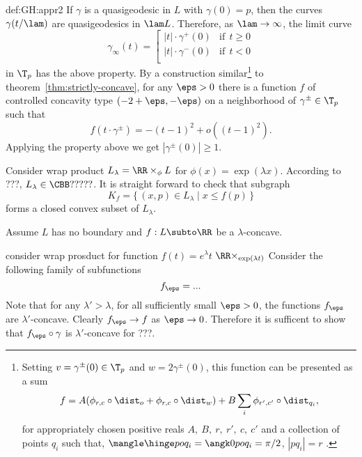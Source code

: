 {\begin{subthm}{def:GH:appr2}
If $\gamma$  is a quasigeodesic in $L$ with $\gamma(0)=p$, then the curves
$\gamma(t/\lam)$ are quasigeodesics in $\lam L$. 
Therefore, as $\lam\to\infty$, the limit curve
$$\gamma_\infty(t)=\left[\begin{matrix}
|t|\cdot\gamma^+(0)&\text{if}\ \  t\ge0\\
|t|\cdot\gamma^-(0)&\text{if}\ \  t<0\\
          \end{matrix}\right.$$
in $\T_p$ has the above property.
By a construction similar\footnote{Setting $v=\gamma^\pm(0)\in \T_p$ and
$w=2\gamma^\pm(0)$, this function can be presented as a sum
$$f=A(\phi_{r,c}\circ\dist_{o}+\phi_{r,c}\circ\dist_w)+B\sum_i\phi_{r',c'}
\circ\dist_{q_i},$$
for appropriately chosen positive reals 
$A,\ B,\ r,\ r',\ c,\ c'$ and a collection of points $q_i$ such that,
$\mangle \hinge p o {q_i}=\angk 0 p o {q_i}=\pi/2$, $|p q_i|=r$ .} 
to theorem~\ref{thm:strictly-concave}, for any $\eps>0$ there is a function $f$ of controlled
concavity type $(-2+\eps,-\eps)$ on a neighborhood of $\gamma^\pm\in \T_p$ such that
$$f(t\cdot\gamma^\pm)=-(t-1)^2+o((t-1)^2).$$
Applying the property above we get $|\gamma^\pm(0)|\ge 1$. \qeds


















Consider wrap product $L_\lambda=\RR\times_\phi L$ for $\phi(x)=\exp(\lambda x)$.
According to ???, $L_\lambda\in \CBB ?????$.
It is straight forward to check that subgraph 
$$K_f=\{\,(x,p)\in L_\lambda \mid x\le f(p)\,\}$$ 
forms a closed convex subset of $L_\lambda$.

Assume $L$ has no boundary and $f:L\subto\RR$ be a $\lambda$-concave.

consider wrap prosduct for function $f(t)=e^\lambda t$ $\RR\times_{\exp(\lambda t)}$
Consider the following family of subfunctions 
$$f_\eps=...$$
Note that for any $\lambda'>\lambda$, for all sufficiently small $\eps>0$, 
the functions $f_\eps$ are $\lambda'$-concave.
Clearly $f_\eps\to f$ as $\eps\to 0$.
Therefore it is sufficent to show that $f_\eps\circ\gamma$ is $\lambda'$-concave for ???.












\end{subthm}}
